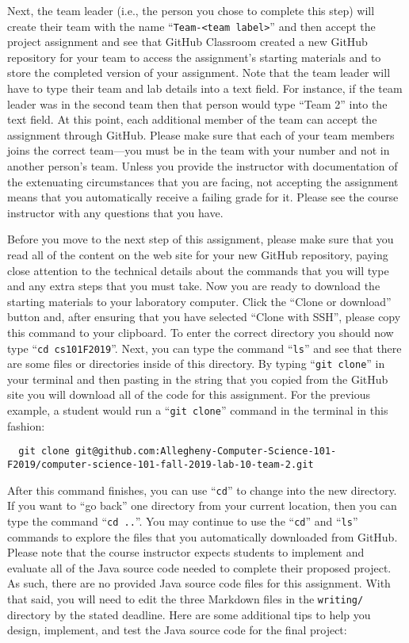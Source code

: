 \documentclass[11pt]{article}
\newcommand{\command}[1]{``\lstinline{#1}''}
\newcommand{\program}[1]{\lstinline{#1}}
\newcommand{\step}[1]{``{#1}''}
\begin{document}
Next, the team leader (i.e., the person you chose to complete this step) will
create their team with the name \command{Team-<team label>} and then accept the
project assignment and see that GitHub Classroom created a new GitHub repository
for your team to access the assignment's starting materials and to store the
completed version of your assignment. Note that the team leader will have to
type their team and lab details into a text field. For instance, if the team
leader was in the second team then that person would type ``Team 2'' into the
text field. At this point, each additional member of the team can accept the
assignment through GitHub. Please make sure that each of your team members joins
the correct team---you must be in the team with your number and not in another
person's team. Unless you provide the instructor with documentation of the
extenuating circumstances that you are facing, not accepting the assignment
means that you automatically receive a failing grade for it. Please see the
course instructor with any questions that you have.


Before you move to the next step of this assignment, please make sure that you
read all of the content on the web site for your new GitHub repository, paying
close attention to the technical details about the commands that you will type
and any extra steps that you must take. Now you are ready to download the
starting materials to your laboratory computer. Click the ``Clone or download''
button and, after ensuring that you have selected ``Clone with SSH'', please
copy this command to your clipboard. To enter the correct directory you should
now type \command{cd cs101F2019}. Next, you can type the command \command{ls}
and see that there are some files or directories inside of this directory. By
typing \command{git clone} in your terminal and then pasting in the string that
you copied from the GitHub site you will download all of the code for this
assignment. For the previous example, a student would run a \command{git clone}
command in the terminal in this fashion:

\begin{lstlisting}
  git clone git@github.com:Allegheny-Computer-Science-101-F2019/computer-science-101-fall-2019-lab-10-team-2.git
\end{lstlisting}

After this command finishes, you can use \command{cd} to change into the new
directory. If you want to \step{go back} one directory from your current
location, then you can type the command \command{cd ..}. You may continue to use
the \command{cd} and \command{ls} commands to explore the files that you
automatically downloaded from GitHub. Please note that the course instructor
expects students to implement and evaluate all of the Java source code needed to
complete their proposed project. As such, there are no provided Java source code
files for this assignment. With that said, you will need to edit the three
Markdown files in the \program{writing/} directory by the stated deadline. Here
are some additional tips to help you design, implement, and test the Java source
code for the final project:
\end{document}
